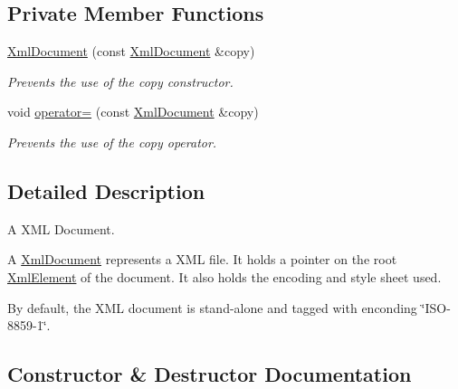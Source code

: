 \subsection*{Private Member Functions}
\begin{DoxyCompactItemize}
\item 
\hyperlink{class_xml_document_a5e344194c740ec037c4303c343b64c50}{Xml\+Document} (const \hyperlink{class_xml_document}{Xml\+Document} \&copy)\hypertarget{class_xml_document_a5e344194c740ec037c4303c343b64c50}{}\label{class_xml_document_a5e344194c740ec037c4303c343b64c50}

\begin{DoxyCompactList}\small\item\em Prevents the use of the copy constructor. \end{DoxyCompactList}\item 
void \hyperlink{class_xml_document_a99b0dc28a8a405a8b85aa94d00f198a7}{operator=} (const \hyperlink{class_xml_document}{Xml\+Document} \&copy)\hypertarget{class_xml_document_a99b0dc28a8a405a8b85aa94d00f198a7}{}\label{class_xml_document_a99b0dc28a8a405a8b85aa94d00f198a7}

\begin{DoxyCompactList}\small\item\em Prevents the use of the copy operator. \end{DoxyCompactList}\end{DoxyCompactItemize}


\subsection{Detailed Description}
A X\+ML Document. 

A \hyperlink{class_xml_document}{Xml\+Document} represents a X\+ML file. It holds a pointer on the root \hyperlink{class_xml_element}{Xml\+Element} of the document. It also holds the encoding and style sheet used.

By default, the X\+ML document is stand-\/alone and tagged with enconding \char`\"{}\+I\+S\+O-\/8859-\/1\char`\"{}. 

\subsection{Constructor \& Destructor Documentation}
